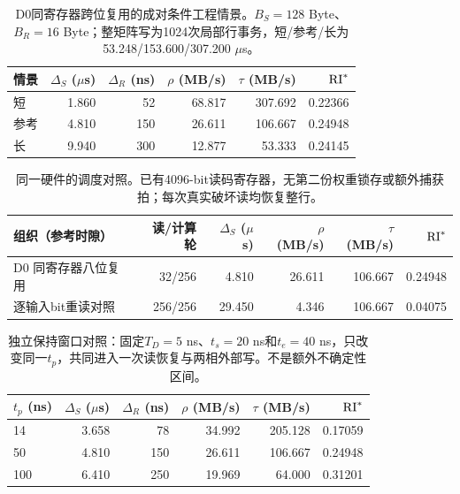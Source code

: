 \begin{table}[htbp]\centering\small
\begin{tabular}{@{}lrrrrr@{}}\toprule
情景 & $\Delta_S$ ($\mu$s) & $\Delta_R$ (ns) & $\rho$ (MB/s) & $\tau$ (MB/s) & $\mathrm{RI}^*$\\\midrule
短 & 1.860 & 52 & 68.817 & 307.692 & 0.22366\\
参考 & 4.810 & 150 & 26.611 & 106.667 & 0.24948\\
长 & 9.940 & 300 & 12.877 & 53.333 & 0.24145\\
\bottomrule\end{tabular}
\caption{D0同寄存器跨位复用的成对条件工程情景。$B_S=128$ Byte、$B_R=16$ Byte；整矩阵写为1024次局部行事务，短/参考/长为53.248/153.600/307.200 $\mu$s。}
\end{table}
\begin{table}[htbp]\centering\small
\begin{tabular}{@{}lrrrrr@{}}\toprule
组织（参考时隙） & 读/计算轮 & $\Delta_S$ ($\mu$s) & $\rho$ (MB/s) & $\tau$ (MB/s) & $\mathrm{RI}^*$\\\midrule
D0 同寄存器八位复用 & 32/256 & 4.810 & 26.611 & 106.667 & 0.24948\\
逐输入bit重读对照 & 256/256 & 29.450 & 4.346 & 106.667 & 0.04075\\
\bottomrule\end{tabular}
\caption{同一硬件的调度对照。已有4096-bit读码寄存器，无第二份权重锁存或额外捕获拍；每次真实破坏读均恢复整行。}
\end{table}
\begin{table}[htbp]\centering\small
\begin{tabular}{@{}lrrrrr@{}}\toprule
$t_p$ (ns) & $\Delta_S$ ($\mu$s) & $\Delta_R$ (ns) & $\rho$ (MB/s) & $\tau$ (MB/s) & $\mathrm{RI}^*$\\\midrule
14 & 3.658 & 78 & 34.992 & 205.128 & 0.17059\\
50 & 4.810 & 150 & 26.611 & 106.667 & 0.24948\\
100 & 6.410 & 250 & 19.969 & 64.000 & 0.31201\\
\bottomrule\end{tabular}
\caption{独立保持窗口对照：固定$T_D=5$ ns、$t_s=20$ ns和$t_e=40$ ns，只改变同一$t_p$，共同进入一次读恢复与两相外部写。不是额外不确定性区间。}
\end{table}
